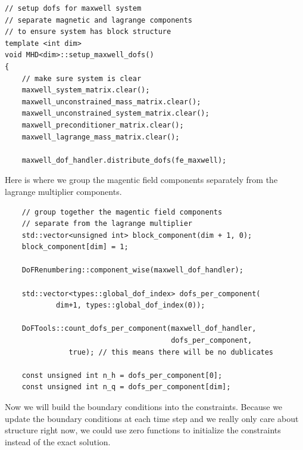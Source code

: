 \documentclass{article}
\begin{document}
\begin{lstlisting}
// setup dofs for maxwell system
// separate magnetic and lagrange components
// to ensure system has block structure
template <int dim>
void MHD<dim>::setup_maxwell_dofs()
{
    // make sure system is clear
    maxwell_system_matrix.clear();
    maxwell_unconstrained_mass_matrix.clear();
    maxwell_unconstrained_system_matrix.clear();
    maxwell_preconditioner_matrix.clear();
    maxwell_lagrange_mass_matrix.clear();

    maxwell_dof_handler.distribute_dofs(fe_maxwell);
\end{lstlisting}
Here is where we group the magentic field components separately from the lagrange multiplier components.
\begin{lstlisting}
    // group together the magentic field components
    // separate from the lagrange multiplier
    std::vector<unsigned int> block_component(dim + 1, 0);
    block_component[dim] = 1;

    DoFRenumbering::component_wise(maxwell_dof_handler);

    std::vector<types::global_dof_index> dofs_per_component(
            dim+1, types::global_dof_index(0));

    DoFTools::count_dofs_per_component(maxwell_dof_handler,
                                       dofs_per_component,
               true); // this means there will be no dublicates

    const unsigned int n_h = dofs_per_component[0];
    const unsigned int n_q = dofs_per_component[dim];
\end{lstlisting}
Now we will build the boundary conditions into the constraints. Because we update the boundary conditions at each time step and we really only care about structure right now, we could use zero functions to initialize the constraints instead of the exact solution. 
\end{document}
